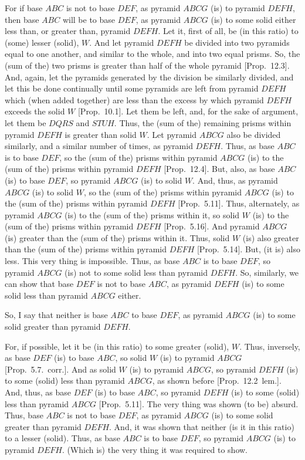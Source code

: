\begin{Parallel}{}{}
{For if base $ABC$ is not to base $DEF$, as pyramid $ABCG$ (is) to pyramid $DEFH$, then base
$ABC$ will be to base $DEF$, as pyramid $ABCG$ (is) to some solid either less than, or greater
than, pyramid $DEFH$. Let it, first of all, be (in this ratio) to (some) lesser (solid), $W$.
And let pyramid $DEFH$ be divided into two pyramids equal to one another, and
similar to the whole,  and into two equal prisms. So, the (sum of the) two prisms is greater than
half of the whole pyramid [Prop.~12.3].  And, again, let the pyramids generated
by the division be similarly divided, and let this be done continually until some pyramids
are left from pyramid $DEFH$ which (when added together) are less than the excess by which pyramid
$DEFH$ exceeds the solid $W$ [Prop.~10.1]. Let them be left, and, for the sake of argument, let them be $DQRS$ and $STUH$. Thus, the (sum of the) remaining prisms within pyramid $DEFH$ is greater than solid $W$. Let pyramid $ABCG$ also be divided similarly, and a similar number of times,
as pyramid $DEFH$. Thus, as base $ABC$ is to base $DEF$, so the (sum of the) prisms within pyramid $ABCG$
(is) to the (sum of the) prisms within pyramid $DEFH$ [Prop.~12.4]. But, also, as base
$ABC$ (is) to base $DEF$, so pyramid $ABCG$ (is) to solid $W$. And, thus, as pyramid $ABCG$ (is)
to solid $W$, so the (sum of the) prisms within pyramid $ABCG$ (is) to the (sum of the)
prisms within pyramid $DEFH$ [Prop.~5.11]. Thus, alternately, as pyramid $ABCG$ (is) to the (sum of the) prisms
within it, so solid $W$ (is) to the (sum of the) prisms within pyramid $DEFH$ [Prop.~5.16]. 
And  pyramid $ABCG$ (is) greater than the (sum of the) prisms within it. Thus, solid $W$ (is)
also greater than the (sum of the) prisms within pyramid $DEFH$ [Prop.~5.14]. But,
(it is) also less. This very thing is impossible. Thus, as base $ABC$ is to base $DEF$, so pyramid
$ABCG$ (is) not to some solid less than pyramid $DEFH$. So, similarly, we can show that 
base $DEF$ is not to base $ABC$, as pyramid $DEFH$ (is) to some solid less than pyramid $ABCG$ either.

So, I say that neither is base $ABC$ to base $DEF$, as pyramid $ABCG$ (is) to 
some solid greater
than pyramid $DEFH$.

For, if possible, let it be (in this ratio) to some greater (solid), $W$. Thus, inversely, as base $DEF$ (is) to base
$ABC$, so solid $W$ (is) to pyramid $ABCG$ [Prop.~5.7.~corr.]. And as solid $W$ (is) to pyramid $ABCG$, so pyramid
$DEFH$ (is) to some (solid) less than pyramid $ABCG$, as shown before [Prop.~12.2~lem.]. And, thus, as base $DEF$ (is) to base
$ABC$, so pyramid $DEFH$ (is) to some (solid) less than pyramid 
$ABCG$ [Prop.~5.11]. The very thing
was shown (to be) absurd. Thus, base $ABC$ is not to base $DEF$, as pyramid $ABCG$ (is) to some
solid greater than pyramid $DEFH$. And, it was shown that neither (is it in this ratio) to a lesser (solid). Thus, as base
$ABC$ is to base $DEF$, so pyramid $ABCG$ (is) to pyramid $DEFH$. (Which is) the very
thing it was required to show.}
\end{Parallel}


